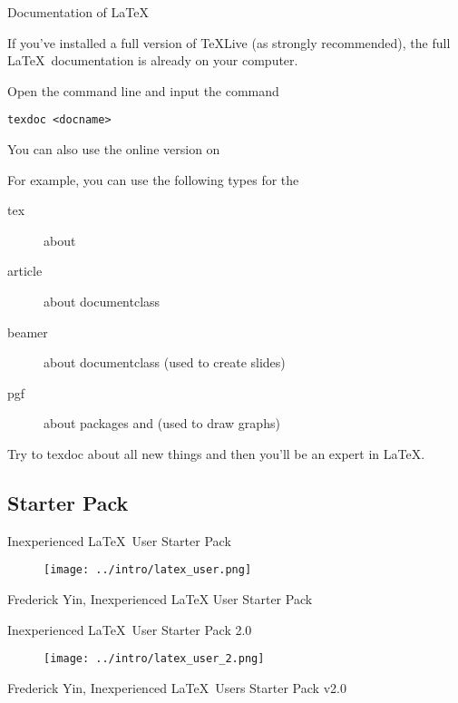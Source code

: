 \begin{frame}[fragile]{Documentation of \LaTeX}

    If you've installed a full version of \TeX Live (as strongly recommended), the full \LaTeX\ documentation is already on your computer. \medskip

    Open the command line and input the command

    \begin{verbatim}
texdoc <docname>
    \end{verbatim}

    You can also use the online version on  \medskip

    For example, you can use the following types for the 
    \begin{description}
        \item[tex] 		about \structure{\TeX}
        \item[article] 	about documentclass 
        \item[beamer] 	about documentclass  (used to create slides)
        \item[pgf]		about packages  and  (used to draw graphs)
    \end{description}
    \smallskip
    Try to \alert{texdoc} about all new things and then you'll be an expert in \LaTeX.
\end{frame}

\subsection*{Starter Pack}

\begin{frame}{Inexperienced \LaTeX\  User Starter Pack}
    \begin{figure}[h]
        \centering
        \texttt{[image: ../intro/latex\_user.png]}
    \end{figure}
    \tiny{Frederick Yin, Inexperienced LaTeX User Starter Pack}
\end{frame}

\begin{frame}{Inexperienced \LaTeX\  User Starter Pack 2.0}
    \begin{figure}[h]
        \centering
        \texttt{[image: ../intro/latex\_user\_2.png]}
    \end{figure}
    \tiny{Frederick Yin, Inexperienced \LaTeX\  Users Starter Pack v2.0}
\end{frame}
